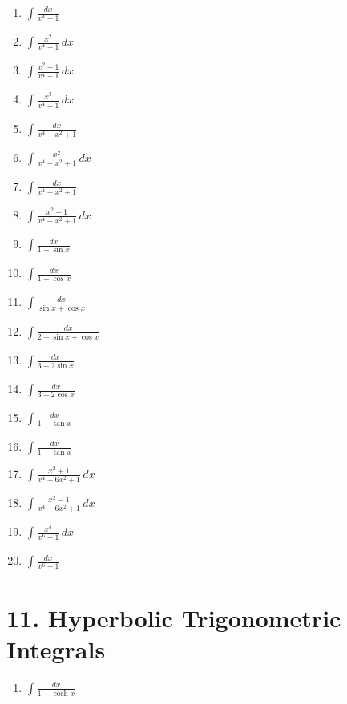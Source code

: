 \documentclass[11pt]{article}
\begin{document}
\begin{enumerate}
\item $\displaystyle \int \frac{dx}{x^4+1}$
\item $\displaystyle \int \frac{x^2}{x^4+1}\,dx$
\item $\displaystyle \int \frac{x^2+1}{x^4+1}\,dx$
\item $\displaystyle \int \frac{x^3}{x^4+1}\,dx$
\item $\displaystyle \int \frac{dx}{x^4+x^2+1}$
\item $\displaystyle \int \frac{x^2}{x^4+x^2+1}\,dx$
\item $\displaystyle \int \frac{dx}{x^4-x^2+1}$
\item $\displaystyle \int \frac{x^2+1}{x^4-x^2+1}\,dx$
\item $\displaystyle \int \frac{dx}{1+\sin x}$
\item $\displaystyle \int \frac{dx}{1+\cos x}$
\item $\displaystyle \int \frac{dx}{\sin x+\cos x}$
\item $\displaystyle \int \frac{dx}{2+\sin x+\cos x}$
\item $\displaystyle \int \frac{dx}{3+2\sin x}$
\item $\displaystyle \int \frac{dx}{3+2\cos x}$
\item $\displaystyle \int \frac{dx}{1+\tan x}$
\item $\displaystyle \int \frac{dx}{1-\tan x}$
\item $\displaystyle \int \frac{x^2+1}{x^4+6x^2+1}\,dx$
\item $\displaystyle \int \frac{x^2-1}{x^4+6x^2+1}\,dx$
\item $\displaystyle \int \frac{x^4}{x^6+1}\,dx$
\item $\displaystyle \int \frac{dx}{x^6+1}$
\end{enumerate}

\section*{11. Hyperbolic Trigonometric Integrals}

\begin{enumerate}
\item $\displaystyle \int \frac{dx}{1+\cosh x}$
\end{enumerate}
\end{document}
